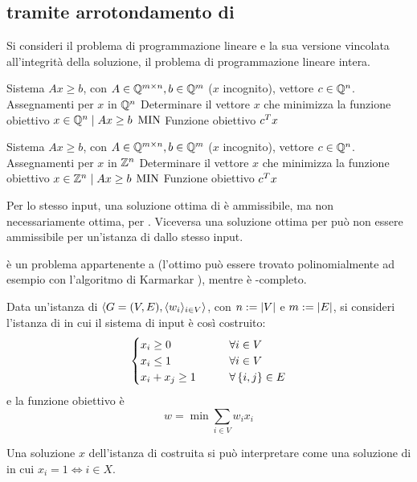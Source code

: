 \subsection{\VertexCover tramite arrotondamento di \LinearProgramming}
Si consideri il problema di programmazione lineare e la sua versione vincolata all'integrità della soluzione, il problema di programmazione lineare intera.

\popt{\LinearProgramming}
{Sistema $Ax\geq b$, con $A\in\mathbb Q^{m\times n},b\in\mathbb Q^m$ ($x$ incognito), vettore $c\in\mathbb Q^n$.}
{Assegnamenti per $x$ in $\mathbb Q^n$}
{Determinare il vettore $x$ che minimizza la funzione obiettivo}
{$x\in\mathbb Q^n\mid Ax\geq b$}
{$\mathrm{MIN}$}
{Funzione obiettivo $c^T x$}

\popt{\IntegerLinearProgramming}
{Sistema $Ax\geq b$, con $A\in\mathbb Q^{m\times n},b\in\mathbb Q^m$ ($x$ incognito), vettore $c\in\mathbb Q^n$.}
{Assegnamenti per $x$ in $\mathbb Z^n$}
{Determinare il vettore $x$ che minimizza la funzione obiettivo}
{$x\in\mathbb Z^n\mid Ax\geq b$}
{$\mathrm{MIN}$}
{Funzione obiettivo $c^T x$}

Per lo stesso input, una soluzione ottima di \IntegerLinearProgramming è ammissibile, ma non necessariamente ottima, per \LinearProgramming.
Viceversa una soluzione ottima per \LinearProgramming può non essere ammissibile per un'istanza di \IntegerLinearProgramming dallo stesso input.

\LinearProgramming è un problema appartenente a \PO (l'ottimo può essere trovato polinomialmente ad esempio con l'algoritmo di Karmarkar \cite{Karmarkar:84:LP}), mentre \IntegerLinearProgramming è \NPO-completo.

Data un'istanza di \VertexCover $\langle G=(V,E),\langle w_i \rangle_{i\in V} \rangle$, con $n:=| V |$ e $m:=| E |$, si consideri l'istanza di \IntegerLinearProgramming in cui il sistema di input è così costruito:
\begin{equation*}
	\begin{cases}
		x_i\geq 0     & \qquad \forall i\in V         \\
		x_i\leq 1     & \qquad \forall i\in V         \\
		x_i+x_j\geq 1 & \qquad \forall \left\{ i,j \right\}\in E \\
	\end{cases}
\end{equation*}
e la funzione obiettivo è
\begin{equation*}
	w = \min\sum_{i\in V} w_i x_i
\end{equation*}

Una soluzione $x$ dell'istanza di \IntegerLinearProgramming costruita si può interpretare come una soluzione di \VertexCover in cui $x_i=1\iff i\in X$.

